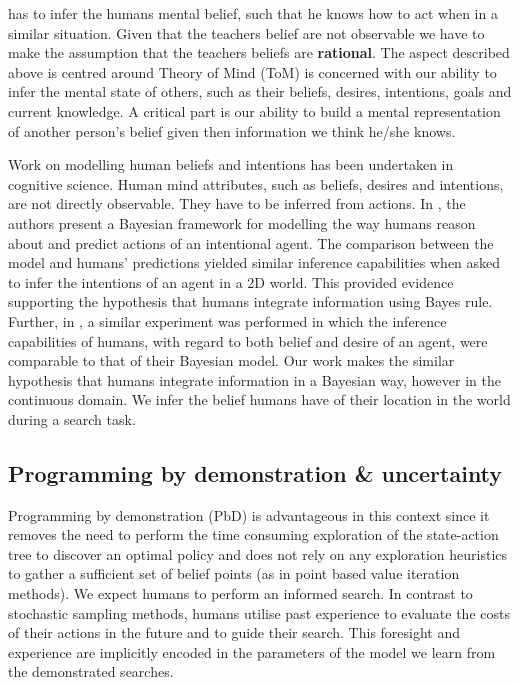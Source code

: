 has to infer the humans mental belief, such that he knows 
how to act when in a similar situation. Given that the teachers belief are not observable we have to make the assumption 
that the teachers beliefs are \textbf{rational}. The aspect described above is centred around Theory of Mind (ToM) 
is concerned with our ability to infer the mental state of others, such as their beliefs, desires, intentions, goals and current knowledge. 
A critical part is our ability to build a mental representation of another person’s belief given then information we think he/she knows.


Work on modelling human beliefs and intentions \cite{Bake_Saxe_Tene_2011}\cite{Richardson1_Baker1_Tenenbaum1_Saxe1_2012} 
has been undertaken in cognitive science. Human mind attributes, such as beliefs, desires and intentions, are not directly observable. 
They have to be inferred from actions. In \cite{Bake_Tene_Saxe_2006}, the authors present a Bayesian framework for modelling the way humans reason
about and predict actions of an intentional agent. The comparison between the model and humans' predictions 
yielded similar inference capabilities when asked to infer the intentions of an agent in a 2D world.
This provided evidence supporting the hypothesis that humans integrate information using Bayes rule. Further, in
\cite{Bake_Saxe_Tene_2011}, a similar experiment was performed in which the inference capabilities of humans,
with regard to both belief and desire of an agent, were comparable to that of their Bayesian model. 
Our work makes the similar hypothesis that humans integrate information in a Bayesian way, however in the 
continuous domain. We infer the belief humans have of their location in the world during a search task.


\subsection{Programming by demonstration \& uncertainty}

Programming by demonstration (PbD) is advantageous in this context since it removes the need to perform the time 
consuming exploration of the state-action tree to discover an optimal policy and does not rely on any exploration 
heuristics to gather a sufficient set of belief points (as in point based value iteration methods). 
We expect humans to perform an informed search. In contrast to stochastic sampling methods, 
humans utilise past experience to evaluate the costs of their actions in the future and to guide their search. This foresight and experience are implicitly encoded 
in the parameters of the model we learn from the demonstrated searches.

